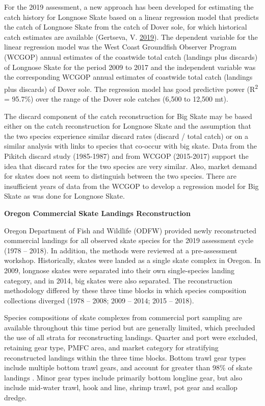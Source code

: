 \documentclass[12pt,]{article}
\begin{document}
For the 2019 assessment, a new approach has been developed for
estimating the catch history for Longnose Skate based on a linear
regression model that predicts the catch of Longnose Skate from the
catch of Dover sole, for which historical catch estimates are available
(Gertseva, V. \protect\hyperlink{ref-Gertseva2019}{2019}). The dependent
variable for the linear regression model was the West Coast Groundfish
Observer Program (WCGOP) annual estimates of the coastwide total catch
(landings plus discards) of Longnose Skate for the period 2009 to 2017
and the independent variable was the corresponding WCGOP annual
estimates of coastwide total catch (landings plus discards) of Dover
sole. The regression model has good predictive power
(R\textsuperscript{2} = 95.7\%) over the range of the Dover sole catches
(6,500 to 12,500 mt).

The discard component of the catch reconstruction for Big Skate may be
based either on the catch reconstruction for Longnose Skate and the
assumption that the two species experience similar discard rates
(discard / total catch) or on a similar analysis with links to species
that co-occur with big skate. Data from the Pikitch discard study
(1985-1987) and from WCGOP (2015-2017) support the idea that discard
rates for the two species are very similar. Also, market demand for
skates does not seem to distinguish between the two species. There are
insufficient years of data from the WCGOP to develop a regression model
for Big Skate as was done for Longnose Skate.

\textbf{Oregon Commercial Skate Landings Reconstruction}

Oregon Department of Fish and Wildlife (ODFW) provided newly
reconstructed commercial landings for all observed skate species for the
2019 assessment cycle (1978 -- 2018). In addition, the methods were
reviewed at a pre-assessment workshop. Historically, skates were landed
as a single skate complex in Oregon. In 2009, longnose skates were
separated into their own single-species landing category, and in 2014,
big skates were also separated. The reconstruction methodology differed
by these three time blocks in which species composition collections
diverged (1978 -- 2008; 2009 -- 2014; 2015 -- 2018).

Species compositions of skate complexes from commercial port sampling
are available throughout this time period but are generally limited,
which precluded the use of all strata for reconstructing landings.
Quarter and port were excluded, retaining gear type, PMFC area, and
market category for stratifying reconstructed landings within the three
time blocks. Bottom trawl gear types include multiple bottom trawl
gears, and account for greater than 98\% of skate landings . Minor gear
types include primarily bottom longline gear, but also include mid-water
trawl, hook and line, shrimp trawl, pot gear and scallop dredge.
\end{document}
